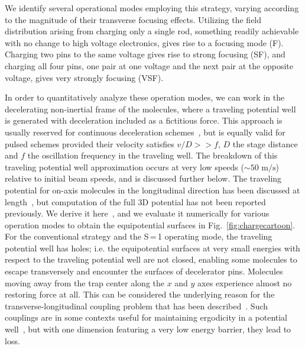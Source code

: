 \documentclass[%
 reprint,
 amsmath,amssymb,
 aps,
prl,
]{revtex4-1}
\begin{document}
We identify several operational modes employing this strategy, varying according to the magnitude of their transverse focusing effects.
Utilizing the field distribution arising from charging only a single rod, something readily achievable with no change to high voltage electronics, gives rise to a focusing mode (F).
Charging two pins to the same voltage gives rise to strong focusing (SF), and charging all four pins, one pair at one voltage and the next pair at the opposite voltage, gives very strongly focusing (VSF).

In order to quantitatively analyze these operation modes, we can work in the decelerating non-inertial frame of the molecules, where a traveling potential well is generated with deceleration included as a fictitious force. 
This approach is usually reserved for continuous deceleration schemes~\cite{Osterwalder2010,Narevicius2008}, but is equally valid for pulsed schemes provided their velocity satisfies $v/D >> f$, $D$ the stage distance and $f$ the oscillation frequency in the traveling well.
The breakdown of this traveling potential well approximation occurs at very low speeds ($\sim\!\!50\text{ m/s}$) relative to initial beam speeds, and is discussed further below.
The traveling potential for on-axis molecules in the longitudinal direction has been discussed at length~\cite{Bethlem2000,Hudson2004}, but computation of the full 3D potential has not been reported previously.
We derive it here~\cite{ssm}, and we evaluate it numerically for various operation modes to obtain the equipotential surfaces in Fig.~\ref{fig:chargecartoon}.
For the conventional strategy and the S\,=\,1 operating mode, the traveling potential well has holes; i.e. the equipotential surfaces at very small energies with respect to the traveling potential well are not closed, enabling some molecules to escape transversely and encounter the surfaces of decelerator pins. 
Molecules moving away from the trap center along the $x$ and $y$ axes experience almost no restoring force at all. 
This can be considered the underlying reason for the transverse-longitudinal coupling problem that has been described~\cite{VanDeMeerakker2006}. 
Such couplings are in some contexts useful for maintaining ergodicity in a potential well~\cite{Surkov1996}, but with one dimension featuring a very low energy barrier, they lead to loss.
\end{document}
